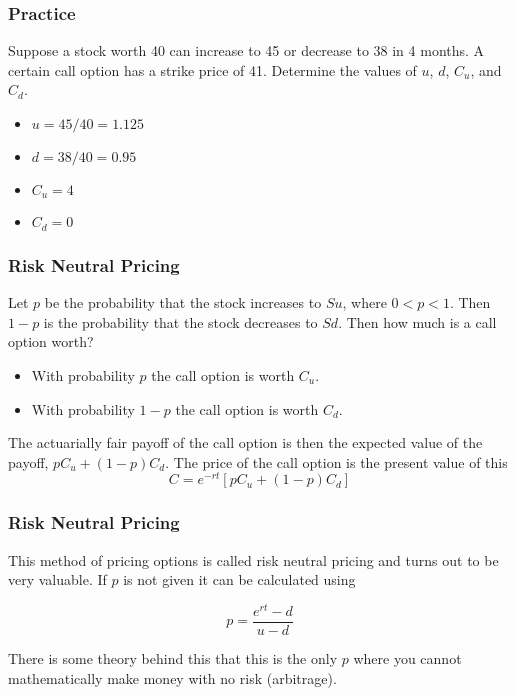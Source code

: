 \documentclass{beamer}
\theoremstyle{plain}
\theoremstyle{definition}
\theoremstyle{remark}
\begin{document}
\begin{frame}
\frametitle{Practice}

Suppose a stock worth 40 can increase to 45 or decrease to 38 in 4 months. A certain call option has a strike price of 41. Determine the values of $u$, $d$, $C_u$, and $C_d$. 

\pause

\begin{itemize}
\item $u = 45/40 = 1.125$
\item $d = 38/40 = 0.95$
\item $C_u = 4$
\item $C_d = 0$
\end{itemize}

\end{frame}


\begin{frame}
\frametitle{Risk Neutral Pricing}

Let $p$ be the probability that the stock increases to $Su$, where $0 < p < 1$. Then $1-p$ is the probability that the stock decreases to $Sd$. Then how much is a call option worth?

\begin{itemize}
\item With probability $p$ the call option is worth $C_u$.
\item With probability $1-p$ the call option is worth $C_d$.
\end{itemize}

The actuarially fair payoff of the call option is then the expected value of the payoff, $p C_u + (1-p) C_d$. The price of the call option is the present value of this \[C = e^{-rt}[p C_u + (1-p) C_d]\]

\end{frame}

\begin{frame}
\frametitle{Risk Neutral Pricing}

This method of pricing options is called risk neutral pricing and turns out to be very valuable. If $p$ is not given it can be calculated using

\[p = \frac{e^{rt}- d}{u-d}\]

There is some theory behind this that this is the only $p$ where you cannot mathematically make money with no risk (arbitrage). 

\end{frame}
\end{document}
